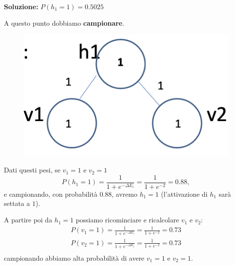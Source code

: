 \textbf{Soluzione:}  $P(h_1=1)=0.5025$



A questo punto dobbiamo \textbf{campionare}.
\begin{figure}[!h]
    \includegraphics[scale=.4]{images/rbm/ex02.png}
    \centering
\end{figure}
Dati questi pesi, se $v_1=1$ e $v_2=1$
\begin{equation}
    P(h_1=1)=\frac{1}{1+e^{-\Delta E_i}}=\frac{1}{1+e^{-2}}=0.88,
\end{equation}
e campionando, con probabilità $0.88$, avremo $h_1=1$ (l'attivazione di $h_1$ sarà settata a $1$).


A partire poi da $h_1=1$ possiamo ricominciare e ricalcolare $v_1$ e $v_2$:
\begin{equation}
    \begin{split}
        P(v_1=1)=\frac{1}{1+e^{-\Delta E_i}}=\frac{1}{1+e^{-2}}=0.73\\
        P(v_2=1)=\frac{1}{1+e^{-\Delta E_i}}=\frac{1}{1+e^{-2}}=0.73\\
    \end{split}
\end{equation}
campionando abbiamo alta probabilità di avere $v_1=1$ e $v_2=1$.


